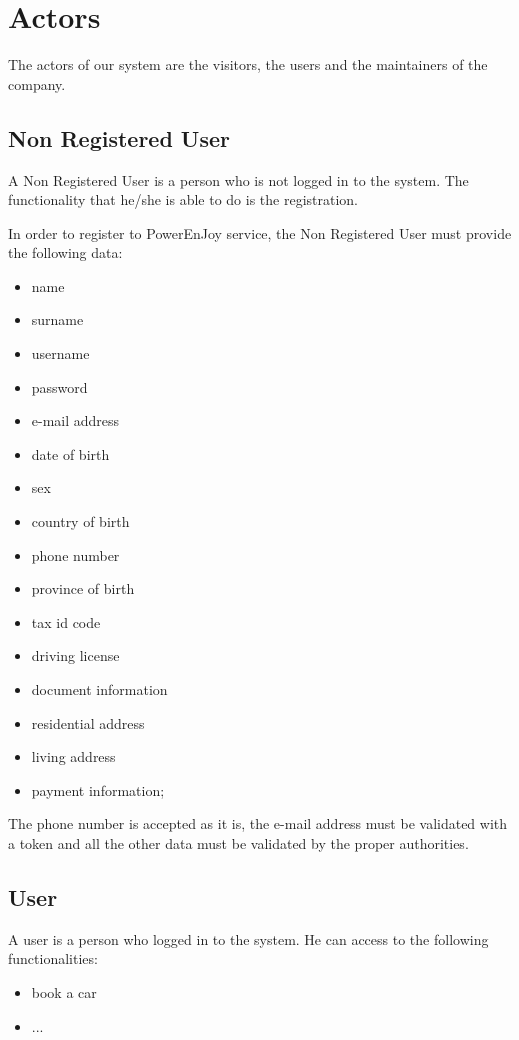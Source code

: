 \section{Actors}
The actors of our system are the visitors, the users and the maintainers of the company.
\subsection{Non Registered User}
A Non Registered User is a person who is not logged in to the system. The functionality that he/she is able to do is the registration.

In order to register to PowerEnJoy service, the Non Registered User must provide the following data:
\begin{itemize}
	\item name
	\item surname
	\item username
	\item password
	\item e-mail address
	\item date of birth
	\item sex
	\item country of birth
	\item phone number
	\item province of birth
	\item tax id code %
	\item driving license
	\item document information
	\item residential address
	\item living address
	\item payment information;
\end{itemize}

The phone number is accepted as it is, the e-mail address must be validated with a token and all
the other data must be validated by the proper authorities.

\subsection{User}
A user is a person who logged in to the system. He can access to the following functionalities:
\begin{itemize}
	\item book a car
	\item ...
\end{itemize}

